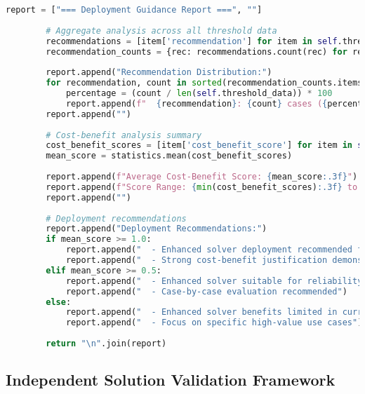 \begin{lstlisting}[language=Python, caption=Cost-Benefit Threshold Analysis for Deployment Guidance]
        report = ["=== Deployment Guidance Report ===", ""]
        
        # Aggregate analysis across all threshold data
        recommendations = [item['recommendation'] for item in self.threshold_data]
        recommendation_counts = {rec: recommendations.count(rec) for rec in set(recommendations)}
        
        report.append("Recommendation Distribution:")
        for recommendation, count in sorted(recommendation_counts.items()):
            percentage = (count / len(self.threshold_data)) * 100
            report.append(f"  {recommendation}: {count} cases ({percentage:.1f}%)")
        report.append("")
        
        # Cost-benefit analysis summary
        cost_benefit_scores = [item['cost_benefit_score'] for item in self.threshold_data]
        mean_score = statistics.mean(cost_benefit_scores)
        
        report.append(f"Average Cost-Benefit Score: {mean_score:.3f}")
        report.append(f"Score Range: {min(cost_benefit_scores):.3f} to {max(cost_benefit_scores):.3f}")
        report.append("")
        
        # Deployment recommendations
        report.append("Deployment Recommendations:")
        if mean_score >= 1.0:
            report.append("  - Enhanced solver deployment recommended for most scenarios")
            report.append("  - Strong cost-benefit justification demonstrated")
        elif mean_score >= 0.5:
            report.append("  - Enhanced solver suitable for reliability-critical applications")
            report.append("  - Case-by-case evaluation recommended")
        else:
            report.append("  - Enhanced solver benefits limited in current test scenarios")
            report.append("  - Focus on specific high-value use cases")
        
        return "\n".join(report)
\end{lstlisting}

\subsection{Independent Solution Validation Framework}
\label{appendix:independent-validation}


